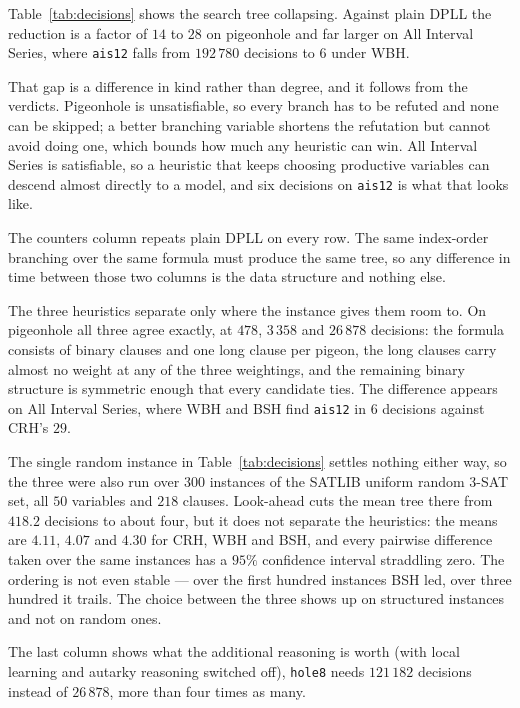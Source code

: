 \documentclass[11pt,a4paper]{article}
\begin{document}


Table~\ref{tab:decisions} shows the search tree collapsing. Against plain DPLL
the reduction is a factor of $14$ to $28$ on pigeonhole and far larger on All
Interval Series, where \texttt{ais12} falls from $192\,780$ decisions to $6$
under WBH.

That gap is a difference in kind rather than degree, and it follows from the
verdicts. Pigeonhole is unsatisfiable, so every branch has to be refuted and
none can be skipped; a better branching variable shortens the refutation but
cannot avoid doing one, which bounds how much any heuristic can win. All
Interval Series is satisfiable, so a heuristic that keeps choosing productive
variables can descend almost directly to a model, and six decisions on
\texttt{ais12} is what that looks like.

The counters column repeats plain DPLL on every row. The same index-order branching over the same formula must produce the
same tree, so any difference in time between those two columns is the data
structure and nothing else.

The three heuristics separate only where the instance gives them room to. On
pigeonhole all three agree exactly, at $478$, $3\,358$ and $26\,878$ decisions:
the formula consists of binary clauses and one long clause per pigeon, the long
clauses carry almost no weight at any of the three weightings, and the
remaining binary structure is symmetric enough that every candidate ties. The
difference appears on All Interval Series, where WBH and BSH find
\texttt{ais12} in $6$ decisions against CRH's $29$.

The single random instance in Table~\ref{tab:decisions} settles nothing either
way, so the three were also run over $300$ instances of the SATLIB uniform
random 3-SAT set, all $50$ variables and $218$ clauses. Look-ahead cuts the
mean tree there from $418.2$ decisions to about four, but it does not separate
the heuristics: the means are $4.11$, $4.07$ and $4.30$ for CRH, WBH and BSH,
and every pairwise difference taken over the same instances has a $95\%$
confidence interval straddling zero. The ordering is not even stable --- over
the first hundred instances BSH led, over three hundred it trails. The choice
between the three shows up on structured instances and not on random ones.

The last column shows what the additional reasoning is worth (with local
learning and autarky reasoning switched off), \texttt{hole8} needs $121\,182$
decisions instead of $26\,878$, more than four times as many.
\end{document}
